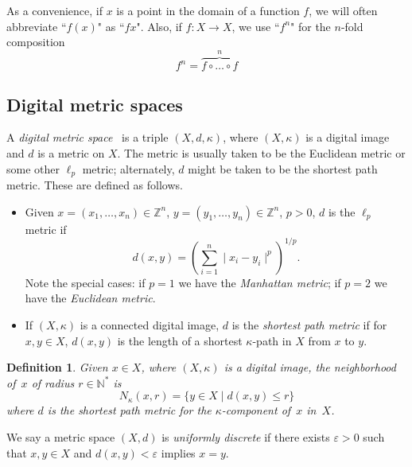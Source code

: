 \documentclass{article}
\newtheorem{definition}[thm]{Definition}
\numberwithin{thm}{section}
\def\Z{{\mathbb Z}}
\def\N{{\mathbb N}}
\begin{document}

As a convenience, if $x$ is a point in the
domain of a function $f$, we will often
abbreviate ``$f(x)$" as ``$fx$".
Also, if $f: X \to X$, we use
``$f^n$" for the $n$-fold composition
\[ f^n = \overbrace{f \circ \ldots \circ f}^{n}
\]

\subsection{Digital metric spaces}
\label{DigMetSp}
A {\em digital metric space}~\cite{EgeKaraca15} is a triple
$(X,d,\kappa)$, where $(X,\kappa)$ is a digital image and $d$ is a metric on $X$. The
metric is usually taken to be the Euclidean
metric or some other $\ell_p$ metric; 
alternately, $d$ might be taken to be the
shortest path metric. These are defined
as follows.
\begin{itemize}
    \item Given 
          $x = (x_1, \ldots, x_n) \in \Z^n$,
          $y = (y_1, \ldots, y_n) \in \Z^n$,
          $p > 0$, $d$ is the $\ell_p$ metric
          if \[ d(x,y) =
          \left ( \sum_{i=1}^n
          \mid x_i - y_i \mid ^ p
          \right ) ^ {1/p}. \]
          Note the special cases: if $p=1$ we
          have the {\em Manhattan metric}; if
          $p=2$ we have the 
          {\em Euclidean metric}.
    \item \cite{ChartTian} If $(X,\kappa)$ is a 
          connected digital image, 
          $d$ is the {\em shortest path metric}
          if for $x,y \in X$, $d(x,y)$ is the 
          length of a shortest
          $\kappa$-path in $X$ from $x$ to $y$.
\end{itemize}

\begin{definition}
    \label{nbd}
    Given $x \in X$, where
    $(X,\kappa)$ is a digital
    image, the {\rm neighborhood
    of~$x$ of radius} $r \in \N^*$
    is
    \[ N_{\kappa}(x,r) = \{ y \in X \mid d(x,y) \le r \}
    \]
    where $d$ is the shortest path
    metric for the $\kappa$-component of~$x$ in~$X$.
\end{definition}

We say a metric space $(X,d)$ is {\em uniformly discrete}
if there exists $\varepsilon > 0$ such that
$x,y \in X$ and $d(x,y) < \varepsilon$ implies $x=y$.
\end{document}
